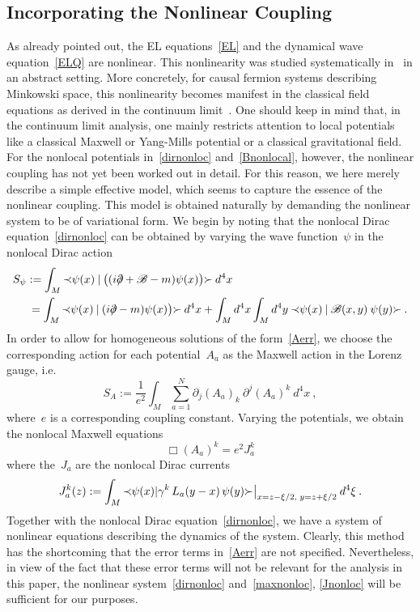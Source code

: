 \documentclass[reqno,11pt]{amsart}
\numberwithin{equation}{section}
\newcommand{\beq}{\begin{equation}}
\newcommand{\eeq}{\end{equation}}
\newcommand{\Sl}{\mbox{$\prec \!\!$ \nolinebreak}}
\newcommand{\Sr}{\mbox{\nolinebreak $\succ$}}
\newcommand{\1}{\mathds{1}}
\newcommand{\Pdd}{\mbox{$\partial$ \hspace{-1.2 em} $/$}}
\newcommand{\B}{{\mathscr{B}}}
\begin{document}
\subsection{Incorporating the Nonlinear Coupling} \label{secnonlinear}
As already pointed out, the EL equations~\eqref{EL} and the dynamical wave equation~\eqref{ELQ}
are nonlinear. This nonlinearity was studied systematically in~\cite{perturb} in an abstract setting.
More concretely, for causal fermion systems describing Minkowski space, this nonlinearity
becomes manifest in the classical field equations as derived in the continuum limit~\cite{cfs}.
One should keep in mind that, in the continuum limit analysis, one mainly restricts attention
to local potentials like a classical Maxwell or Yang-Mills potential or a classical gravitational field.
For the nonlocal potentials in~\eqref{dirnonloc} and~\eqref{Bnonlocal}, however, the nonlinear
coupling has not yet been worked out in detail. For this reason, we here merely describe 
a simple effective model, which seems to capture the essence of the
nonlinear coupling.
This model is obtained naturally by demanding the nonlinear system to be of variational form.
We begin by noting that the nonlocal Dirac equation~\eqref{dirnonloc} can be obtained
by varying the wave function~$\psi$ in the nonlocal Dirac action
\begin{align*}
S_\psi &:= \int_M \Sl \psi(x)\:|\: \big((i \Pdd + \B - m) \psi(x) \big) \Sr\: d^4x \\
&\,= \int_M \Sl \psi(x)\:|\: (i \Pdd - m) \psi(x) \big) \Sr\: d^4x 
+ \int_M d^4x \int_M d^4y \:\Sl \psi(x) \:|\: \B(x,y)\: \psi(y) \Sr \:.
\end{align*}
In order to allow for homogeneous solutions of the form~\eqref{Aerr}, we choose the
corresponding action for each potential~$A_a$ as the Maxwell action in the Lorenz gauge, i.e.
\beq \label{SAdef}
S_A := \frac{1}{e^2} \int_M \sum_{a=1}^N \partial_j (A_a)_k\: \partial^j (A_a)^k\: d^4x \:,
\eeq
where~$e$ is a corresponding coupling constant.
Varying the potentials, we obtain the nonlocal Maxwell equations
\beq \label{maxnonloc}
\Box (A_a)^k = e^2 J_a^k 
\eeq
where the~$J_a$ are the nonlocal Dirac currents
\beq \label{Jnonloc}
J_a^k(z) := \int_M \Sl \psi(x) | \gamma^k\, L_a(y-x)\, \psi(y)\Sr
\big|_{x=z-\xi/2, \;y = z+\xi/2}\: d^4 \xi \:.
\eeq
Together with the nonlocal Dirac equation~\eqref{dirnonloc}, we have a system of nonlinear
equations describing the dynamics of the system.
Clearly, this method has the shortcoming that the error terms in~\eqref{Aerr} are not specified.
Nevertheless, in view of the fact that these error terms will not be relevant for the analysis in this paper,
the nonlinear system~\eqref{dirnonloc} and~\eqref{maxnonloc}, \eqref{Jnonloc}
will be sufficient for our purposes.
\end{document}
